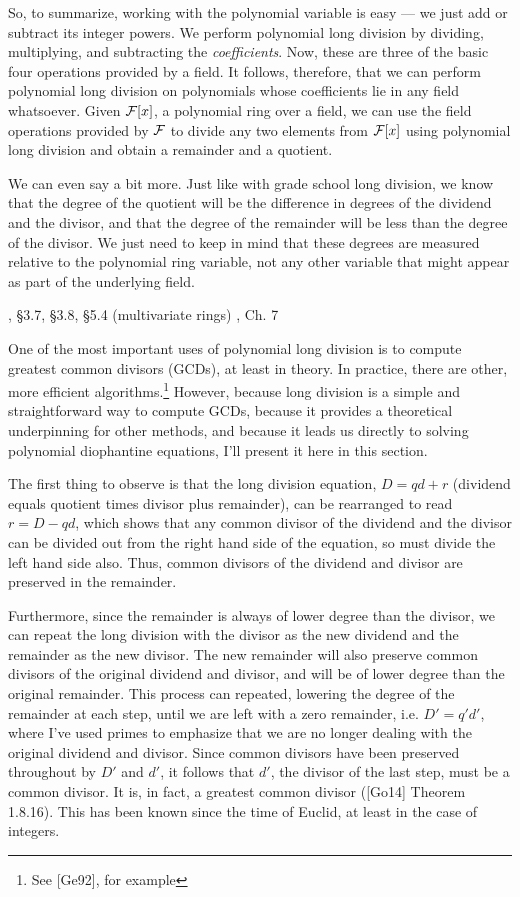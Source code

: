 So, to summarize, working with the polynomial variable is easy --- we
just add or subtract its integer powers.  We perform polynomial long
division by dividing, multiplying, and subtracting the {\it
coefficients}.  Now, these are three of the basic four operations
provided by a field.  It follows, therefore, that we can perform
polynomial long division on polynomials whose coefficients lie in any
field whatsoever.  Given ${\cal F}[x]$, a polynomial ring over a
field, we can use the field operations provided by ${\cal F}$ to
divide any two elements from ${\cal F}[x]$ using polynomial long
division and obtain a remainder and a quotient.

We can even say a bit more.  Just like with grade school long
division, we know that the degree of the quotient will be the
difference in degrees of the dividend and the divisor, and that the
degree of the remainder will be less than the degree of the divisor.
We just need to keep in mind that these degrees are measured relative
to the polynomial ring variable, not any other variable that might
appear as part of the underlying field.

, \S3.7, \S3.8, \S5.4 (multivariate rings)\hfil\break
\hbox{}\qquad [Ge92], Ch. 7

One of the most important uses of polynomial long division is to
compute greatest common divisors (GCDs), at least in theory.  In
practice, there are other, more efficient algorithms.\footnote{See
[Ge92], for example} However, because long division is a simple and
straightforward way to compute GCDs, because it provides a theoretical
underpinning for other methods, and because it leads us directly to
solving polynomial diophantine equations, I'll present it here in this
section.

The first thing to observe is that the long division equation, $D = qd
+ r$ (dividend equals quotient times divisor plus remainder), can be
rearranged to read $r = D - qd$, which shows that any common divisor
of the dividend and the divisor can be divided out from the right hand
side of the equation, so must divide the left hand side also.  Thus,
common divisors of the dividend and divisor are preserved in the
remainder.

Furthermore, since the remainder is always of lower degree than the
divisor, we can repeat the long division with the divisor as the new
dividend and the remainder as the new divisor.  The new remainder will
also preserve common divisors of the original dividend and divisor,
and will be of lower degree than the original remainder.  This process
can repeated, lowering the degree of the remainder at each step, until
we are left with a zero remainder, i.e. $D' = q' d'$, where I've used
primes to emphasize that we are no longer dealing with the original
dividend and divisor.  Since common divisors have been preserved
throughout by $D'$ and $d'$, it follows that $d'$, the divisor of the
last step, must be a common divisor.  It is, in fact, a greatest
common divisor ([Go14] Theorem 1.8.16).  This has been known since the
time of Euclid, at least in the case of integers.

